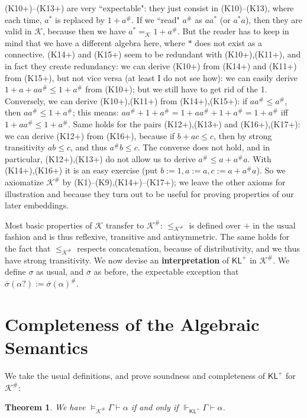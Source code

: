 \documentclass{eptcs}
\newtheorem{thm}[defn]{Theorem}
\newcommand{\KA}{\mathcal{K}}
\newcommand{\osigma}{\overline{\sigma}}
\newcommand{\KL}{\mathsf{KL}}
\begin{document}
(K10+)--(K13+) are very ``expectable": they just consist in
(K10)--(K13), where each time, $a^*$ is replaced by $1+a^\#$.
If we ``read" $a^\#$ as $aa^*$ (or $a^*a$), then they are valid
in $\KA$,
because then we have $a^*=_\KA 1+a^\#$. But the reader has
to keep in mind that we have a different algebra here, where
$*$ does not exist as a connective. (K14+) and (K15+) seem to be redundant
with (K10+),(K11+), and in fact they create redundancy: we can derive
(K10+) from (K14+) and (K11+) from (K15+), but not vice versa
(at least I do not see how): we can easily derive  
$1+a+aa^\#\leq 1+a^\#$ from (K10+); but we still have to get rid of the 1.
Conversely, we can derive (K10+),(K11+) from (K14+),(K15+):
if $aa^\#\leq a^\#$, then $aa^\#\leq 1+a^\#$; this means:
$aa^\#+1+a^\#=1+aa^\#+1+a^\#=1+a^\#$
iff $1+aa^\#\leq 1+a^\#$.
Same holds for the pairs (K12+),(K13+) and (K16+),(K17+):
we can derive (K12+) from (K16+), because if $b+ac\leq c$, then
by strong transitivity $ab\leq c$, and thus $a^\#b\leq c$. 
The converse does not hold, 
and in particular, (K12+),(K13+) do not allow us to derive $a^\#\leq a+a^\#a$.
With (K14+),(K16+) it is an easy exercise (put $b:=1,a:=a,c:=a+a^\#a$).
So we axiomatize $\KA^\#$ by (K1)--(K9),(K14+)--(K17+);
we leave the other axioms for illustration and because they turn
out to be useful for proving properties of our later embeddings.

Most basic properties of $\KA$ transfer to $\KA^\#$: $\leq_{\KA^\#}$
is defined over $+$ in the usual fashion and is thus reflexive,
transitive and antisymmetric. 
The same holds for the fact that $\leq_{\KA^\#}$ 
respects concatenation, because of distributivity, and we thus have
strong transitivity. 
We now devise an \textbf{interpretation} of $\KL^+$ in $\KA^\#$. 
We define $\sigma$ as usual, and $\osigma$ as before, the expectable
exception that
\\

$\osigma(\alpha?):=\osigma(\alpha)^\#$.
\\



\section{Completeness of the Algebraic Semantics}

We take the usual definitions, and prove soundness and completeness
of $\KL^+$ for $\KA^\#$:

\begin{thm}
We have $\models_{\KA^\#}\Gamma\vdash\alpha$  if and only if
$\Vdash_{\KL^+}\Gamma\vdash\alpha$.
\end{thm}
\end{document}
